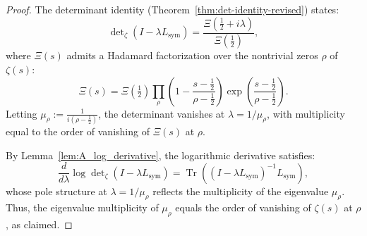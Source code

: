 \begin{proof}
The determinant identity (Theorem~\ref{thm:det-identity-revised}) states:
\[
\det\nolimits_{\zeta}(I - \lambda L_{\mathrm{sym}})
= \frac{\Xi\left(\tfrac{1}{2} + i\lambda\right)}{\Xi\left(\tfrac{1}{2}\right)},
\]
where \( \Xi(s) \) admits a Hadamard factorization over the nontrivial zeros \( \rho \) of \( \zeta(s) \):
\[
\Xi(s) = \Xi\left(\tfrac{1}{2}\right)
\prod_\rho \left(1 - \frac{s - \tfrac{1}{2}}{\rho - \tfrac{1}{2}}\right)
\exp\left( \frac{s - \tfrac{1}{2}}{\rho - \tfrac{1}{2}} \right).
\]
Letting \( \mu_\rho := \frac{1}{i(\rho - \tfrac{1}{2})} \), the determinant vanishes at \( \lambda = 1/\mu_\rho \), with multiplicity equal to the order of vanishing of \( \Xi(s) \) at \( \rho \).

By Lemma~\ref{lem:A_log_derivative}, the logarithmic derivative satisfies:
\[
\frac{d}{d\lambda} \log \det\nolimits_\zeta(I - \lambda L_{\mathrm{sym}})
= \operatorname{Tr}\left( (I - \lambda L_{\mathrm{sym}})^{-1} L_{\mathrm{sym}} \right),
\]
whose pole structure at \( \lambda = 1/\mu_\rho \) reflects the multiplicity of the eigenvalue \( \mu_\rho \). Thus, the eigenvalue multiplicity of \( \mu_\rho \) equals the order of vanishing of \( \zeta(s) \) at \( \rho \), as claimed.
\end{proof}
% 